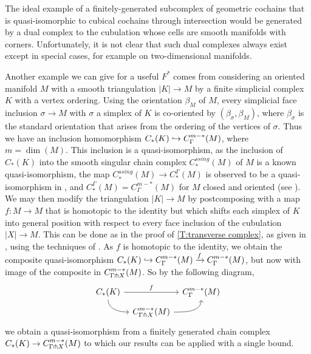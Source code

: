 The ideal example of a finitely-generated subcomplex of geometric cochains that is quasi-isomorphic to cubical cochains through intersection
would be generated by a dual complex to the cubulation whose cells are smooth manifolds with corners.
Unfortunately, it is not clear that such dual complexes always exist except in special cases, for example on two-dimensional manifolds.

Another example we can give for a useful $F^*$ comes from considering an oriented manifold $M$ with a smooth triangulation $|K|\to M$ by a finite simplicial complex $K$ with a vertex ordering.
Using the orientation $\beta_M$ of $M$, every simplicial face inclusion $\sigma\to M$ with $\sigma$ a simplex of $K$ is co-oriented by $(\beta_\sigma,\beta_M)$, where $\beta_\sigma$ is the standard orientation that arises from the ordering of the vertices of $\sigma$.
Thus we have an inclusion homomorphism $C_*(K)\hookrightarrow C^{m-*}_\Gamma(M)$, where $m = \dim(M)$.
This inclusion is a quasi-isomorphism, as the inclusion of $C_*(K)$ into the smooth singular chain complex $C_*^{ssing}(M)$ of $M$ is a known quasi-isomorphism, the map $C_*^{ssing}(M) \to C_*^\Gamma(M)$ is observed to be a quasi-isomorphism in \cite[Section 10]{Lipy14}, and $C_*^\Gamma(M)=C^{m-*}_\Gamma(M)$ for $M$ closed and oriented (see \cite[Section 12]{Lipy14}).
We may then modify the triangulation $|K|\to M$ by postcomposing with a map $f \colon M\to M$ that is homotopic to the identity but which shifts each simplex of $K$ into general position with respect to every face inclusion of the cubulation $|X|\to M$.
This can be done as in the proof of \cref{T:transverse complex}, as given in \cite{medina2022foundations}, using the techniques of \cite[Section 2.3]{GuPo74}.
As $f$ is homotopic to the identity, we obtain the composite quasi-isomorphism $C_*(K)\hookrightarrow C^{m-*}_\Gamma(M) \xrightarrow{f} C^{m-*}_\Gamma(M)$, but now with image of the composite in $C^{m-*}_{\Gamma \pitchfork X}(M)$.
So by the following diagram,
\begin{equation*}
	\begin{tikzcd}[column sep=tiny, row sep=tiny]
		C_*(K) \arrow[rr, "f"] \arrow[dr, out=-90, in=180]& & C^{m-*}_{\Gamma}(M) \\
		& C^{m-*}_{\Gamma \pf X}(M) \arrow[ur, out=0, in =-90] &
	\end{tikzcd}
\end{equation*}
we obtain a quasi-isomorphism from a finitely generated chain complex $C_*(K) \to C^{m-*}_{\Gamma \pitchfork X}(M)$ to which our results can be applied with a single bound.

